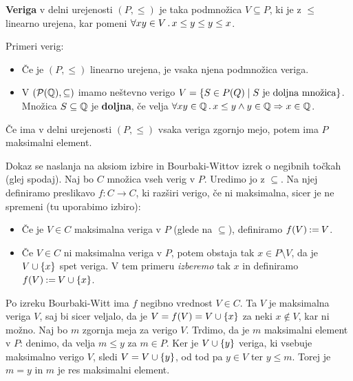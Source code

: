 \begin{definicija}
  \textbf{Veriga} v delni urejenosti $(P, {\leq})$ je taka podmnožica $V \subseteq
  P$, ki je z $\leq$ linearno urejena, kar pomeni $\forall x y \in V \,.\, x \leq y \leq y \leq x$.
\end{definicija}

\begin{primer}
  Primeri verig:
  \begin{itemize}
  \item Če je $(P, {\leq})$ linearno urejena, je vsaka njena podmnožica veriga.
  \item V $(\mathcal{P}(\mathbb{Q}), {\subseteq})$ imamo neštevno verigo
    $V = \left\{S \in P(Q) \mid \text{$S$ je doljna množica}\right\}$.
    Množica $S \subseteq \mathbb{Q}$ je \textbf{doljna}, če velja
    $\forall x y \in \mathbb{Q} \,.\, x \leq y \land y \in \mathbb{Q} \Rightarrow x \in \mathbb{Q}$.
  \end{itemize}
\end{primer}

\begin{lema}
  Če ima v delni urejenosti $(P, {\leq})$ vsaka veriga zgornjo mejo,
  potem ima $P$ maksimalni element.
\end{lema}

\begin{dokaz}
  Dokaz se naslanja na aksiom izbire in Bourbaki-Wittov izrek o negibnih točkah (glej
  spodaj). Naj bo $C$ množica vseh verig v $P$. Uredimo jo z $\subseteq$. Na njej definiramo preslikavo
  $f : C \to C$, ki razširi verigo, če ni maksimalna, sicer je ne spremeni (tu uporabimo
  izbiro):
  \begin{itemize}
  \item Če je $V \in C$ maksimalna veriga v $P$ (glede na $\subseteq$), definiramo $f(V) \mathbin{{:}{=}} V$.
  \item Če $V \in C$ ni maksimalna veriga v $P$, potem obstaja tak $x \in P \setminus V$, da je $V
    \cup \left\{x\right\}$ spet veriga. V tem primeru \emph{izberemo} tak $x$ in definiramo $f(V) \mathbin{{:}{=}} V
    \cup \left\{x\right\}$.
  \end{itemize}
  Po izreku Bourbaki-Witt ima $f$ negibno vrednost $V \in C$. Ta $V$ je maksimalna
  veriga $V$, saj bi sicer veljalo, da je $V = f(V) = V \cup \left\{x\right\}$ za neki $x \not\in V$,
  kar ni možno. Naj bo $m$ zgornja meja za verigo $V$. Trdimo, da je $m$
  maksimalni element v $P$: denimo, da velja $m \leq y$ za $m \in P$. Ker je $V \cup \left\{y\right\}$
  veriga, ki vsebuje maksimalno verigo $V$, sledi $V = V \cup \left\{y\right\}$, od tod pa $y \in V$
  ter $y \leq m$. Torej je $m = y$ in $m$ je res maksimalni element.
\end{dokaz}

